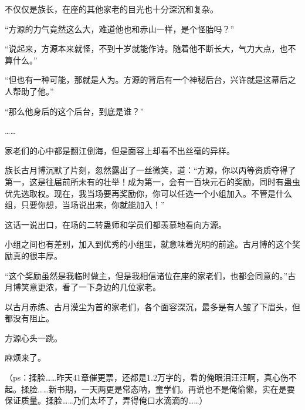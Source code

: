 \begin{this_body}
不仅仅是族长，在座的其他家老的目光也十分深沉和复杂。

“方源的力气竟然这么大，难道他也和赤山一样，是个怪胎吗？”

“说起来，方源本来就怪，不到十岁就能作诗。随着他不断长大，气力大点，也不算什么。”

“但也有一种可能，那就是人为。方源的背后有一个神秘后台，兴许就是这幕后之人帮助了他。”

“那么他身后的这个后台，到底是谁？”

……

家老们的心中都是翻江倒海，但是面容上却看不出丝毫的异样。

族长古月博沉默了片刻，忽然露出了一丝微笑，道：“方源，你以丙等资质夺得了第一，这是往届前所未有的壮举！成为第一，会有一百块元石的奖励，同时有蛊虫优先选取权。现在，我当场要再奖励你，你可以任选一个小组加入。不管是什么组，只要你想，当场说出来，你就能加入！”

这话一说出口，在场的二转蛊师和学员们都羡慕地看向方源。

小组之间也有差别，加入到优秀的小组里，就意味着光明的前途。古月博的这个奖励真的很丰厚。

“这个奖励虽然是我临时做主，但是我相信诸位在座的家老们，也都会同意的。”古月博笑意更浓，看了一下身边的几位家老。

以古月赤练、古月漠尘为首的家老们，各个面容深沉，最多是有人皱了下眉头，但都没有阻止。

方源心头一跳。

麻烦来了。

（ps：揉脸……昨天41章催更票，还都是1.2万字的，看的俺眼泪汪汪啊，真心伤不起。揉脸……新书期，一天两更是常态呐，童学们。再说也不是俺偷懒，实在是要保证质量。揉脸……乃们太坏了，弄得俺口水滴滴的……）

\end{this_body}

